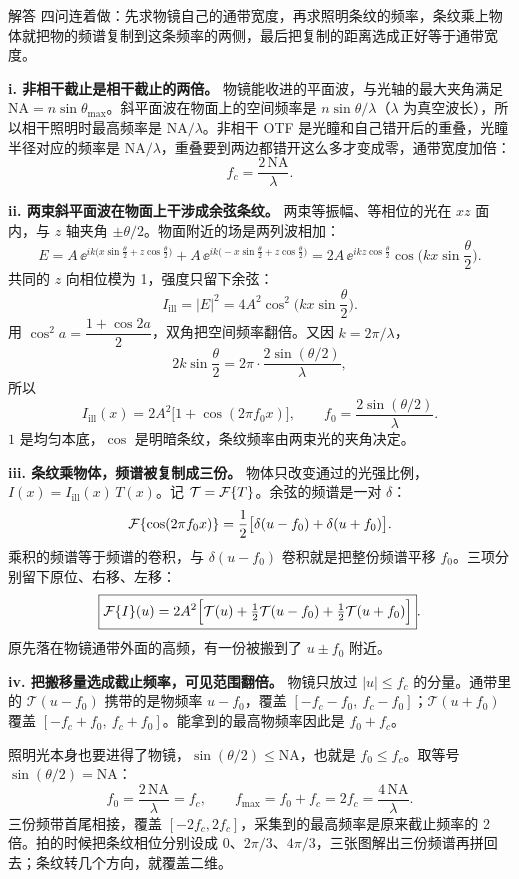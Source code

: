 \begin{exam}{解答}
四问连着做：先求物镜自己的通带宽度，再求照明条纹的频率，条纹乘上物体就把物的频谱复制到这条频率的两侧，最后把复制的距离选成正好等于通带宽度。

\textbf{i. 非相干截止是相干截止的两倍。}
物镜能收进的平面波，与光轴的最大夹角满足 $\mathrm{NA}=n\sin\theta_{\max}$。斜平面波在物面上的空间频率是 $n\sin\theta/\lambda$（$\lambda$ 为真空波长），所以相干照明时最高频率是 $\mathrm{NA}/\lambda$。非相干 OTF 是光瞳和自己错开后的重叠，光瞳半径对应的频率是 $\mathrm{NA}/\lambda$，重叠要到两边都错开这么多才变成零，通带宽度加倍：
\[
\boxed{f_c=\frac{2\,\mathrm{NA}}{\lambda}} .
\]

\textbf{ii. 两束斜平面波在物面上干涉成余弦条纹。}
两束等振幅、等相位的光在 $xz$ 面内，与 $z$ 轴夹角 $\pm\theta/2$。物面附近的场是两列波相加：
\[
E=A\,\ee^{ik\bigl(x\sin\frac\theta2+z\cos\frac\theta2\bigr)}
+A\,\ee^{ik\bigl(-x\sin\frac\theta2+z\cos\frac\theta2\bigr)}
=2A\,\ee^{ikz\cos\frac\theta2}\cos\!\Big(kx\sin\frac\theta2\Big).
\]
共同的 $z$ 向相位模为 1，强度只留下余弦：
\[
I_{\text{ill}}=|E|^2=4A^2\cos^2\!\Big(kx\sin\frac\theta2\Big).
\]
用 $\cos^2 a=\dfrac{1+\cos 2a}{2}$，双角把空间频率翻倍。又因 $k=2\pi/\lambda$，
\[
2k\sin\frac\theta2=2\pi\cdot\frac{2\sin(\theta/2)}{\lambda},
\]
所以
\[
I_{\text{ill}}(x)=2A^2\big[1+\cos(2\pi f_0 x)\big],\qquad
\boxed{f_0=\frac{2\sin(\theta/2)}{\lambda}} .
\]
$1$ 是均匀本底，$\cos$ 是明暗条纹，条纹频率由两束光的夹角决定。

\textbf{iii. 条纹乘物体，频谱被复制成三份。}
物体只改变通过的光强比例，$I(x)=I_{\text{ill}}(x)\,T(x)$。记 $\mathcal T=\mathcal{F}\{T\}$。余弦的频谱是一对 $\delta$：
\[
\mathcal{F}\{\cos(2\pi f_0 x)\}=\frac12\bigl[\delta(u-f_0)+\delta(u+f_0)\bigr].
\]
乘积的频谱等于频谱的卷积，与 $\delta(u-f_0)$ 卷积就是把整份频谱平移 $f_0$。三项分别留下原位、右移、左移：
\[
\boxed{\mathcal{F}\{I\}(u)=2A^2\Big[\mathcal T(u)+\tfrac12\mathcal T(u-f_0)+\tfrac12\mathcal T(u+f_0)\Big]} .
\]
原先落在物镜通带外面的高频，有一份被搬到了 $u\pm f_0$ 附近。

\textbf{iv. 把搬移量选成截止频率，可见范围翻倍。}
物镜只放过 $|u|\le f_c$ 的分量。通带里的 $\mathcal T(u-f_0)$ 携带的是物频率 $u-f_0$，覆盖 $[-f_c-f_0,\ f_c-f_0]$；$\mathcal T(u+f_0)$ 覆盖 $[-f_c+f_0,\ f_c+f_0]$。能拿到的最高物频率因此是 $f_0+f_c$。

照明光本身也要进得了物镜，$\sin(\theta/2)\le\mathrm{NA}$，也就是 $f_0\le f_c$。取等号 $\sin(\theta/2)=\mathrm{NA}$：
\[
f_0=\frac{2\,\mathrm{NA}}{\lambda}=f_c,\qquad f_{\max}=f_0+f_c=2f_c=\frac{4\,\mathrm{NA}}{\lambda}.
\]
三份频带首尾相接，覆盖 $[-2f_c,2f_c]$，采集到的最高频率是原来截止频率的 2 倍。拍的时候把条纹相位分别设成 $0$、$2\pi/3$、$4\pi/3$，三张图解出三份频谱再拼回去；条纹转几个方向，就覆盖二维。
\end{exam}

